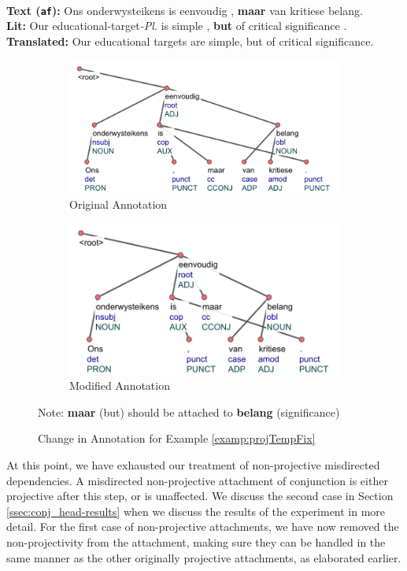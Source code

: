 \begin{example}
\label{examp:projTempFix}
\textbf{ }\\
\textbf{Text (\texttt{af}):} Ons onderwysteikens is eenvoudig , \textbf{maar} van kritiese belang.\\
\textbf{Lit:} Our educational-target\textit{-Pl.} is simple , \textbf{but} of critical significance .\\
\textbf{Translated:} Our educational targets are simple, but of critical significance.
\end{example}
\begin{figure}[H]
    \centering
    \begin{subfigure}{\textwidth}
    \includegraphics{img/projTempFixOriginal.png}
    \caption{Original Annotation}
    \end{subfigure}
    \begin{subfigure}{\textwidth}
    \includegraphics{img/projTempFixModified.png}
    \caption{Modified Annotation}  
    \end{subfigure}
    \caption{Change in Annotation for Example \ref{examp:projTempFix}}
    Note: \textbf{maar} (but) should be attached to \textbf{belang} (significance)
    \label{fig:projTempFixexample}
\end{figure}

At this point, we have exhausted our treatment of non-projective misdirected dependencies. A misdirected non-projective attachment of conjunction is either projective after this step, or is unaffected. We discuss the second case in Section \ref{ssec:conj_head-results} when we discuss the results of the experiment in more detail. For the first case of non-projective attachments, we have now removed the non-projectivity from the attachment, making sure they can be handled in the same manner as the other originally projective attachments, as elaborated earlier. 

